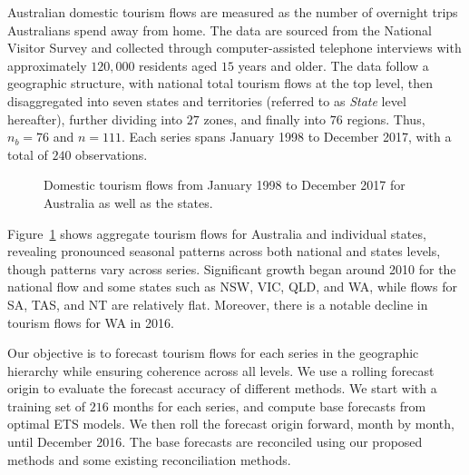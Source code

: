 \documentclass[
  11pt]{article}
\theoremstyle{plain}
\theoremstyle{remark}
\begin{document}
Australian domestic tourism flows are measured as the number of
overnight trips Australians spend away from home. The data are sourced
from the National Visitor Survey and collected through computer-assisted
telephone interviews with approximately \(120,000\) residents aged
\(15\) years and older. The data follow a geographic structure, with
national total tourism flows at the top level, then disaggregated into
seven states and territories (referred to as \emph{State} level
hereafter), further dividing into \(27\) zones, and finally into \(76\)
regions. Thus, \(n_b=76\) and \(n=111\). Each series spans January 1998
to December 2017, with a total of \(240\) observations.

\begin{figure}


\caption{\label{fig-tourism-data}Domestic tourism flows from January
1998 to December 2017 for Australia as well as the states.}

\end{figure}%

Figure~\ref{fig-tourism-data} shows aggregate tourism flows for
Australia and individual states, revealing pronounced seasonal patterns
across both national and states levels, though patterns vary across
series. Significant growth began around 2010 for the national flow and
some states such as NSW, VIC, QLD, and WA, while flows for SA, TAS, and
NT are relatively flat. Moreover, there is a notable decline in tourism
flows for WA in 2016.

Our objective is to forecast tourism flows for each series in the
geographic hierarchy while ensuring coherence across all levels. We use
a rolling forecast origin to evaluate the forecast accuracy of different
methods. We start with a training set of \(216\) months for each series,
and compute base forecasts from optimal ETS models. We then roll the
forecast origin forward, month by month, until December 2016. The base
forecasts are reconciled using our proposed methods and some existing
reconciliation methods.
\end{document}

